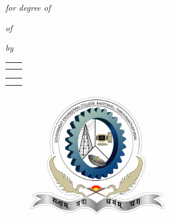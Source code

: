 \thispagestyle{empty}
\begin{center}
	{ \Large {\bfseries {\ReportTitle}} \par}
	\vspace{2\baselineskip}
	{\textit{\RoportType for degree of}}\\
		\par
	\vspace{\baselineskip}
	{\textit{of} \par}
	\vspace{\baselineskip}
	{\large \bf \Degree \par} 
	\vspace{\baselineskip}
	{\textit{by} \par}
	\vspace{\baselineskip}
	\begin{center}
		\begin{tabular}{c | c}
			\large {\bf\firstAuthor} & \large {\bf\secondAuthor} \\
			\large {\bf\firstAuthorID} & \large {\bf\secondAuthorID}
		\end{tabular}
	\end{center}
	\begin{center}
		\begin{tabular}{c | c}
			\large {\bf\thirdAuthor} & \large {\bf\fourthAuthor} \\
			\large {\bf\thirdAuthorID} & \large {\bf\fourthAuthorID}
		\end{tabular}
	\end{center}
	
	\vspace{1.5\baselineskip}
	{\begin{figure}[!h] 
			\centering
			\includegraphics[width=60mm]{logo.png} 
		\end{figure}
	}
	\vspace{\baselineskip}
	{\bf \MakeUppercase{\Department} \par}
	\vspace*{1ex}
	{\bf \MakeUppercase{\University} \par}
	\vspace*{5ex}
	{\bf \MakeUppercase{\reportSubmissionDate} \par}    
	
\end{center}